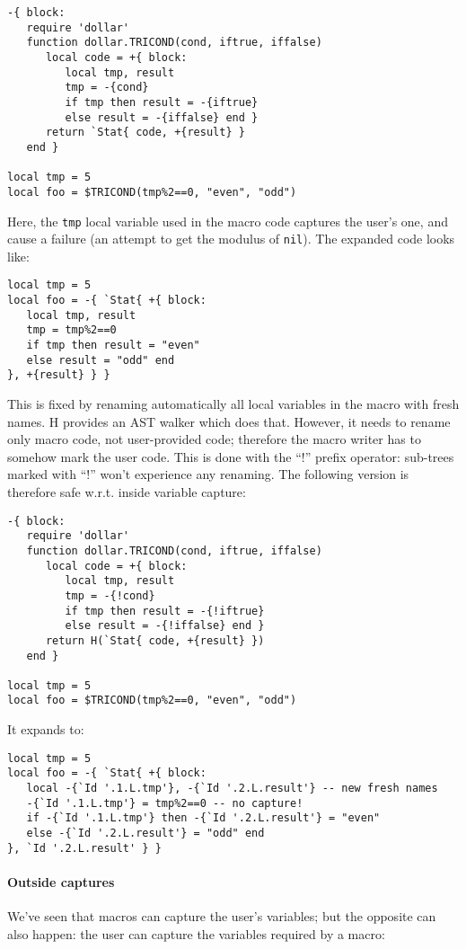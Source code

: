\begin{verbatim}
-{ block:
   require 'dollar'
   function dollar.TRICOND(cond, iftrue, iffalse)
      local code = +{ block:
         local tmp, result
         tmp = -{cond}
         if tmp then result = -{iftrue} 
         else result = -{iffalse} end }
      return `Stat{ code, +{result} }
   end }

local tmp = 5
local foo = $TRICOND(tmp%2==0, "even", "odd")
\end{verbatim}

Here, the \verb|tmp| local variable used in the macro code captures
the user's one, and cause a failure (an attempt to get the modulus of
\verb|nil|). The expanded code looks like:
\begin{Verbatim}
local tmp = 5
local foo = -{ `Stat{ +{ block:
   local tmp, result
   tmp = tmp%2==0
   if tmp then result = "even"
   else result = "odd" end
}, +{result} } }
\end{Verbatim}

This is fixed by renaming automatically all local variables in the
macro with fresh names. H provides an AST walker which does
that. However, it needs to rename only macro code, not user-provided
code; therefore the macro writer has to somehow mark the user
code. This is done with the ``!'' prefix operator: sub-trees marked
with ``!'' won't experience any renaming. The following version is
therefore safe w.r.t. inside variable capture:

\begin{verbatim}
-{ block:
   require 'dollar'
   function dollar.TRICOND(cond, iftrue, iffalse)
      local code = +{ block:
         local tmp, result
         tmp = -{!cond}
         if tmp then result = -{!iftrue} 
         else result = -{!iffalse} end }
      return H(`Stat{ code, +{result} })
   end }

local tmp = 5
local foo = $TRICOND(tmp%2==0, "even", "odd")
\end{verbatim}

It expands to:

\begin{Verbatim}
local tmp = 5
local foo = -{ `Stat{ +{ block:
   local -{`Id '.1.L.tmp'}, -{`Id '.2.L.result'} -- new fresh names
   -{`Id '.1.L.tmp'} = tmp%2==0 -- no capture!
   if -{`Id '.1.L.tmp'} then -{`Id '.2.L.result'} = "even"
   else -{`Id '.2.L.result'} = "odd" end
}, `Id '.2.L.result' } }
\end{Verbatim}

\paragraph{Outside captures}
We've seen that macros can capture the user's variables; but the
opposite can also happen: the user can capture the variables required
by a macro:

